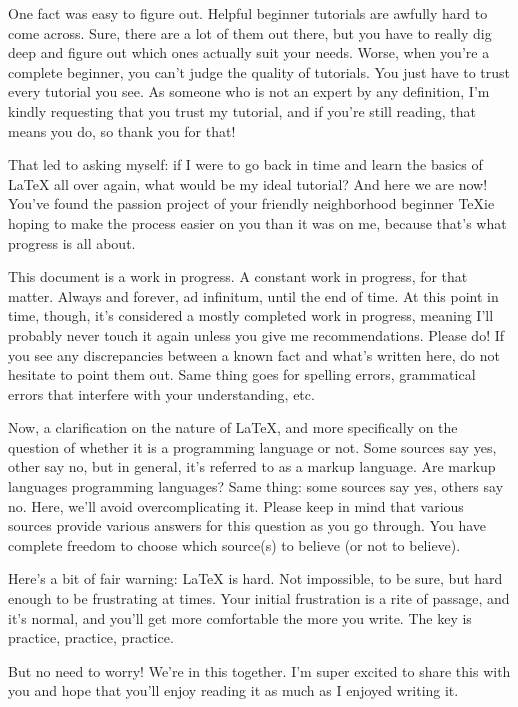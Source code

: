\documentclass[letterpaper, 12pt]{article}
\begin{document}
One fact was easy to figure out. Helpful beginner tutorials are awfully hard to come across. Sure, there are a lot of them out there, but you have to really dig deep and figure out which ones actually suit your needs. Worse, when you're a complete beginner, you can't judge the quality of tutorials. You just have to trust every tutorial you see. As someone who is not an expert by any definition, I'm kindly requesting that you trust my tutorial, and if you're still reading, that means you do, so thank you for that!

That led to asking myself: if I were to go back in time and learn the basics of \LaTeX{} all over again, what would be my ideal tutorial? And here we are now! You've found the passion project of your friendly neighborhood beginner \TeX ie hoping to make the process easier on you than it was on me, because that's what progress is all about.

This document is a work in progress. A constant work in progress, for that matter. Always and forever, ad infinitum, until the end of time. At this point in time, though, it's considered a mostly completed work in progress, meaning I'll probably never touch it again unless you give me recommendations. Please do! If you see any discrepancies between a known fact and what's written here, do not hesitate to point them out. Same thing goes for spelling errors, grammatical errors that interfere with your understanding, etc.

Now, a clarification on the nature of \LaTeX, and more specifically on the question of whether it is a programming language or not. Some sources say yes, other say no, but in general, it's referred to as a markup language. Are markup languages programming languages? Same thing: some sources say yes, others say no. Here, we'll avoid overcomplicating it. Please keep in mind that various sources provide various answers for this question as you go through. You have complete freedom to choose which source(s) to believe (or not to believe).

Here's a bit of fair warning: \LaTeX{} is hard. Not impossible, to be sure, but hard enough to be frustrating at times. Your initial frustration is a rite of passage, and it's normal, and you'll get more comfortable the more you write. The key is practice, practice, practice.

But no need to worry! We're in this together. I'm super excited to share this with you and hope that you'll enjoy reading it as much as I enjoyed writing it.
\end{document}
